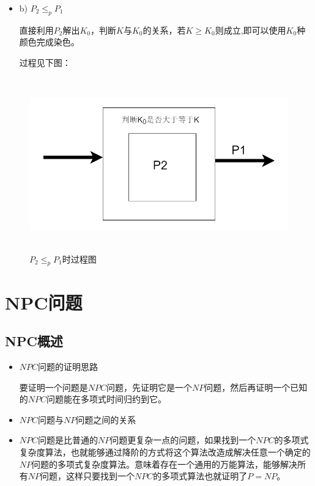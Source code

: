 \begin{itemize}
	\item b) $P_2\leq_pP_1$
	
	直接利用$P_2$解出$K_0$，判断$K$与$K_0$的关系，若$K\geq K_0$则成立,即可以使用$K_0$种颜色完成染色。
	
过程见下图：
\end{itemize}	

		\begin{figure}[ht]
		\begin{minipage}[t]{1\linewidth}
			\centering
			\includegraphics[width=15cm,height=7.5cm]{image/P_NP3.png}
			\caption{$P_2\leq_pP_1$时过程图}
		\end{minipage}
	\end{figure}
	
\newpage
	\section{NPC问题}
	\subsection{NPC概述}

\begin{itemize}
	\item $NPC$问题的证明思路
	
要证明一个问题是$NPC$问题，先证明它是一个$NP$问题，然后再证明一个已知的$NPC$问题能在多项式时间归约到它。
\end{itemize}

\begin{itemize}
	\item $NPC$问题与$NP$问题之间的关系
\end{itemize}

\begin{itemize}
	\item $NPC$问题是比普通的$NP$问题更复杂一点的问题，如果找到一个$NPC$的多项式复杂度算法，也就能够通过降阶的方式将这个算法改造成解决任意一个确定的$NP$问题的多项式复杂度算法。意味着存在一个通用的万能算法，能够解决所有$NP$问题，这样只要找到一个$NPC$的多项式算法也就证明了$P=NP$。
\end{itemize}	


